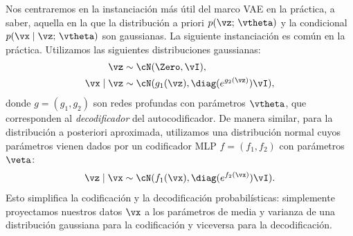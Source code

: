 \documentclass[../../book-main_es.tex]{subfiles}
\begin{document}
Nos centraremos en la instanciación más útil del marco VAE en la práctica, 
a saber, aquella en la que la distribución a priori $p(\vz;\,\vtheta)$ y la 
condicional $p(\vx \mid \vz;\,\vtheta)$ son gaussianas.
La siguiente instanciación es común en la práctica. Utilizamos las siguientes
distribuciones gaussianas:
\begin{align*}
    \vz &\sim \cN(\Zero, \vI), \\
    \vx \mid \vz &\sim \cN(g_1(\vz), \diag(e^{g_2(\vz)}) \vI),
\end{align*}
donde $g = (g_1, g_2)$ son redes profundas con parámetros $\vtheta$, que
corresponden al \textit{decodificador} del autocodificador.
De manera similar, para la distribución a posteriori aproximada, utilizamos
una distribución normal cuyos parámetros vienen dados por un
codificador MLP $f = (f_1, f_2)$ con parámetros $\veta$:
\begin{equation*}
    \vz \mid \vx \sim \cN(f_1(\vx), \diag(e^{f_2(\vx)}) \vI).
\end{equation*}
Esto simplifica la codificación y la decodificación probabilísticas: simplemente proyectamos nuestros datos
$\vx$ a los parámetros de media y varianza de una distribución gaussiana para
la codificación y viceversa para la decodificación.
\end{document}
